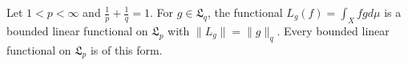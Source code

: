 Let $1 < p < \infty$ and $\frac{1}{p} + \frac{1}{q} = 1$. For $g \in \mathfrak{L}_{q}$, the functional $L_g(f) = \int_X f g d\mu$ is a bounded linear functional on $\mathfrak{L}_p$ with $\|L_g\| = \|g\|_q$. Every bounded linear functional on $\mathfrak{L}_p$ is of this form.
